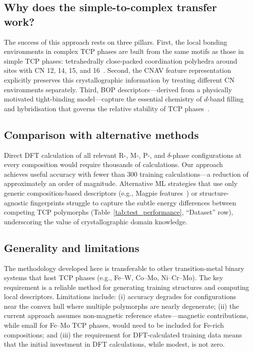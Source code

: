 
\subsection{Why does the simple-to-complex transfer work?}

The success of this approach rests on three pillars. First, the local bonding environments in complex TCP phases are built from the same motifs as those in simple TCP phases: tetrahedrally close-packed coordination polyhedra around sites with CN 12, 14, 15, and 16~\cite{joubert_tcp}. Second, the CNAV feature representation explicitly preserves this crystallographic information by treating different CN environments separately. Third, BOP descriptors---derived from a physically motivated tight-binding model---capture the essential chemistry of $d$-band filling and hybridisation that governs the relative stability of TCP phases~\cite{bopfox, drautz_bop}.

\subsection{Comparison with alternative methods}

Direct DFT calculation of all relevant R-, M-, P-, and $\delta$-phase configurations at every composition would require thousands of calculations. Our approach achieves useful accuracy with fewer than 300 training calculations---a reduction of approximately an order of magnitude. Alternative ML strategies that use only generic composition-based descriptors (e.g., Magpie features~\cite{magpie}) or structure-agnostic fingerprints struggle to capture the subtle energy differences between competing TCP polymorphs (Table~\ref{tab:test_performance}, ``Dataset'' row), underscoring the value of crystallographic domain knowledge.

\subsection{Generality and limitations}

The methodology developed here is transferable to other transition-metal binary systems that host TCP phases (e.g., Fe--W, Co--Mo, Ni--Cr--Mo). The key requirement is a reliable method for generating training structures and computing local descriptors. Limitations include: (i) accuracy degrades for configurations near the convex hull where multiple polymorphs are nearly degenerate; (ii) the current approach assumes non-magnetic reference states---magnetic contributions, while small for Fe--Mo TCP phases, would need to be included for Fe-rich compositions; and (iii) the requirement for DFT-calculated training data means that the initial investment in DFT calculations, while modest, is not zero.

